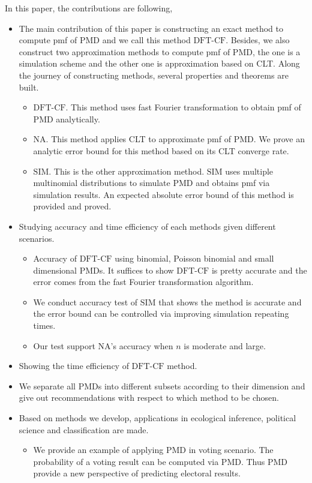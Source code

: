 \documentclass[12pt]{article}
\newcommand{\PMD}{\textrm{PMD}}
\newcommand{\SIM}{{\textrm{SIM}}}
\newcommand{\NA}{{\textrm{NA}}}
\newcommand{\dft}{{\textrm{DFT-CF}}}
\begin{document}
In this paper, the contributions are following,
\begin{itemize}
	\item The main contribution of this paper is constructing an exact method to compute pmf of $\PMD$ and we call this method $\dft$. Besides, we also construct two approximation methods to compute pmf of $\PMD$, the one is a simulation scheme and the other one is approximation based on CLT. Along the journey of constructing methods, several properties and theorems are built.
	\begin{itemize}
		\item $\dft$. This method uses fast Fourier transformation to obtain pmf of $\PMD$ analytically. 
		\item $\NA$. This method applies CLT to approximate pmf of $\PMD$. We prove an analytic error bound for this method based on its CLT converge rate.
		\item $\SIM$. This is the other approximation method. $\SIM$ uses multiple multinomial distributions to simulate $\PMD$ and obtains pmf via simulation results. An expected absolute error bound of this method is provided and proved.
	\end{itemize}
	\item Studying accuracy and time efficiency of each methods given different scenarios.
	\begin{itemize}
		\item Accuracy of $\dft$ using binomial, Poisson binomial and small dimensional $\PMD$s. It suffices to show $\dft$ is pretty accurate and the error comes from the fast Fourier transformation algorithm.
		\item We conduct accuracy test of $\SIM$ that shows the method is accurate and the error bound can be controlled via improving simulation repeating times.
		\item Our test support $\NA$'s accuracy when $n$ is moderate and large.
	\end{itemize}
	\item Showing the time efficiency of $\dft$ method.
	\item We separate all $\PMD$s into different subsets according to their dimension and give out recommendations with respect to which method to be chosen.
	\item Based on methods we develop, applications in ecological inference, political science and classification are made.
	\begin{itemize}
		\item We provide an example of applying $\PMD$ in voting scenario. The probability of a voting result can be computed via $\PMD$. Thus $\PMD$ provide a new perspective of predicting electoral results.

\end{itemize}
\end{itemize}
\end{document}
